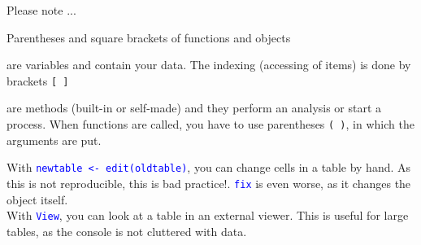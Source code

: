 \documentclass[xcolor=table,       handout,    xcolor=dvipsnames]{beamer}\usepackage[]{graphicx}\usepackage[]{color}
\newcommand{\rcode}[1]{\texttt{\textcolor{Blue}{#1}}} %
\begin{document}

\begin{frame}[fragile]{Please note ...}
\begin{block}{Parentheses and square brackets of functions and objects}
\pause
\begin{description}[<+->]
\item[objects] are variables and contain your data. The indexing (accessing of items) is done by brackets \texttt{[ ]}
\item[functions] are methods (built-in or self-made) and they perform an analysis or start a process. When functions are called, you have to use parentheses \texttt{( )}, in which the arguments are put.
\end{description}
\end{block}
 With \rcode{newtable <- edit(oldtable)}, you can change cells in a table by hand. \alert{As this is not reproducible, this is bad practice!}. \rcode{fix} is even worse, as it changes the object itself.\\
With \rcode{View}, you can look at a table in an external viewer. This is useful for large tables, as the console is not cluttered with data.
\end{frame}

\end{document}
